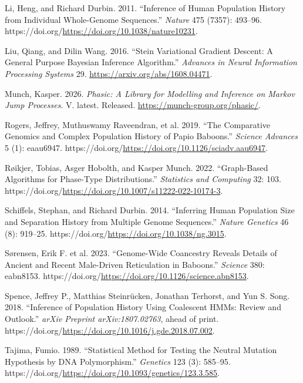 \documentclass[
  10pt,
  a4paper,
]{scrbook}
\newlength{\cslhangindent}
\newenvironment{CSLReferences}[2] %
 {\begin{list}{}{%
  \setlength{\itemindent}{0pt}
  \setlength{\leftmargin}{0pt}
  \setlength{\parsep}{0pt}
  \ifodd #1
   \setlength{\leftmargin}{\cslhangindent}
   \setlength{\itemindent}{-1\cslhangindent}
  \fi
  \setlength{\itemsep}{#2\baselineskip}}}
 {\end{list}}
\let\oldemph\emph
\renewcommand\emph[1]{\oldemph{\color{gray}#1}}
\begin{document}
\begin{CSLReferences}{1}{1}
Li, Heng, and Richard Durbin. 2011. {``Inference of Human Population
History from Individual Whole-Genome Sequences.''} \emph{Nature} 475
(7357): 493--96.
https://doi.org/\url{https://doi.org/10.1038/nature10231}.

Liu, Qiang, and Dilin Wang. 2016. {``Stein Variational Gradient Descent:
A General Purpose Bayesian Inference Algorithm.''} \emph{Advances in
Neural Information Processing Systems} 29.
\url{https://arxiv.org/abs/1608.04471}.

Munch, Kasper. 2026. \emph{Phasic: A Library for Modelling and Inference
on Markov Jump Processes}. V. latest. Released.
\url{https://munch-group.org/phasic/}.

{Rogers, Jeffrey, Muthuswamy Raveendran, et al.} 2019. {``The
Comparative Genomics and Complex Population History of Papio Baboons.''}
\emph{Science Advances} 5 (1): eaau6947.
https://doi.org/\url{https://doi.org/10.1126/sciadv.aau6947}.

Røikjer, Tobias, Asger Hobolth, and Kasper Munch. 2022. {``Graph-Based
Algorithms for Phase-Type Distributions.''} \emph{Statistics and
Computing} 32: 103.
https://doi.org/\url{https://doi.org/10.1007/s11222-022-10174-3}.

Schiffels, Stephan, and Richard Durbin. 2014. {``Inferring Human
Population Size and Separation History from Multiple Genome
Sequences.''} \emph{Nature Genetics} 46 (8): 919--25.
https://doi.org/\url{https://doi.org/10.1038/ng.3015}.

{Sørensen, Erik F. et al.} 2023. {``Genome-Wide Coancestry Reveals
Details of Ancient and Recent Male-Driven Reticulation in Baboons.''}
\emph{Science} 380: eabn8153.
https://doi.org/\url{https://doi.org/10.1126/science.abn8153}.

Spence, Jeffrey P., Matthias Steinrücken, Jonathan Terhorst, and Yun S.
Song. 2018. {``Inference of Population History Using Coalescent HMMs:
Review and Outlook.''} \emph{arXiv Preprint arXiv:1807.02763}, ahead of
print. https://doi.org/\url{https://doi.org/10.1016/j.gde.2018.07.002}.

Tajima, Fumio. 1989. {``Statistical Method for Testing the Neutral
Mutation Hypothesis by {DNA} Polymorphism.''} \emph{Genetics} 123 (3):
585--95.
https://doi.org/\url{https://doi.org/10.1093/genetics/123.3.585}.


\end{CSLReferences}
\end{document}
